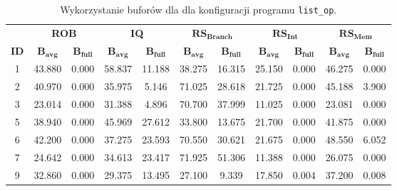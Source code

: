 \begin{table}[]
\centering
\caption{ Wykorzystanie buforów dla dla konfiguracji programu \texttt{list\_op}. }
\label{tab:buffers_list_op}
\begin{tabular}{|c|cc|cc|cc|cc|cc|}
\hline& \multicolumn{2}{c|}{\textbf{ROB}} & \multicolumn{2}{c|}{\textbf{IQ}} & \multicolumn{2}{c|}{$\mathbf{RS_{Branch}}$} & \multicolumn{2}{c|}{$\mathbf{RS_{Int}}$} & \multicolumn{2}{c|}{$\mathbf{RS_{Mem}}$} \\ \cline{2-11}
\multirow{-2}{*}{\cellcolor[HTML]{EFEFEF}\textbf{ID}} & $\mathbf{B_{avg}}$ & \cellcolor[HTML]{EFEFEF}$\mathbf{B_{full}}$ & $\mathbf{B_{avg}}$ & \cellcolor[HTML]{EFEFEF}$\mathbf{B_{full}}$ & $\mathbf{B_{avg}}$ & \cellcolor[HTML]{EFEFEF}$\mathbf{B_{full}}$ & $\mathbf{B_{avg}}$ & \cellcolor[HTML]{EFEFEF}$\mathbf{B_{full}}$ & $\mathbf{B_{avg}}$ & \cellcolor[HTML]{EFEFEF}$\mathbf{B_{full}}$ \\ \hline
1 & 43.880 & \cellcolor[HTML]{EFEFEF}0.000 & 58.837 & \cellcolor[HTML]{EFEFEF}11.188 & 38.275 & \cellcolor[HTML]{EFEFEF}16.315 & 25.150 & \cellcolor[HTML]{EFEFEF}0.000 & 46.275 & \cellcolor[HTML]{EFEFEF}0.000 \\ \hline
2 & 40.970 & \cellcolor[HTML]{EFEFEF}0.000 & 35.975 & \cellcolor[HTML]{EFEFEF}5.146 & 71.025 & \cellcolor[HTML]{EFEFEF}28.618 & 21.725 & \cellcolor[HTML]{EFEFEF}0.000 & 45.188 & \cellcolor[HTML]{EFEFEF}3.900 \\ \hline
3 & 23.014 & \cellcolor[HTML]{EFEFEF}0.000 & 31.388 & \cellcolor[HTML]{EFEFEF}4.896 & 70.700 & \cellcolor[HTML]{EFEFEF}37.999 & 11.025 & \cellcolor[HTML]{EFEFEF}0.000 & 23.081 & \cellcolor[HTML]{EFEFEF}0.000 \\ \hline
5 & 38.940 & \cellcolor[HTML]{EFEFEF}0.000 & 45.969 & \cellcolor[HTML]{EFEFEF}27.612 & 33.800 & \cellcolor[HTML]{EFEFEF}13.675 & 21.700 & \cellcolor[HTML]{EFEFEF}0.000 & 41.875 & \cellcolor[HTML]{EFEFEF}0.000 \\ \hline
6 & 42.200 & \cellcolor[HTML]{EFEFEF}0.000 & 37.275 & \cellcolor[HTML]{EFEFEF}23.593 & 70.550 & \cellcolor[HTML]{EFEFEF}30.621 & 21.675 & \cellcolor[HTML]{EFEFEF}0.000 & 48.550 & \cellcolor[HTML]{EFEFEF}6.052 \\ \hline
7 & 24.642 & \cellcolor[HTML]{EFEFEF}0.000 & 34.613 & \cellcolor[HTML]{EFEFEF}23.417 & 71.925 & \cellcolor[HTML]{EFEFEF}51.306 & 11.388 & \cellcolor[HTML]{EFEFEF}0.000 & 26.075 & \cellcolor[HTML]{EFEFEF}0.000 \\ \hline
9 & 32.860 & \cellcolor[HTML]{EFEFEF}0.000 & 29.375 & \cellcolor[HTML]{EFEFEF}13.495 & 27.100 & \cellcolor[HTML]{EFEFEF}9.339 & 17.850 & \cellcolor[HTML]{EFEFEF}0.004 & 37.200 & \cellcolor[HTML]{EFEFEF}0.008 \\ \hline

\end{tabular}
\end{table}
